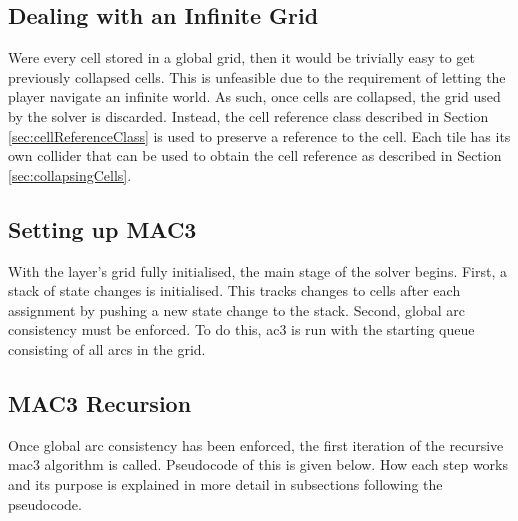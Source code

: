 \subsection{Dealing with an Infinite Grid}
Were every cell stored in a global grid, then it would be trivially easy to get previously collapsed cells. This is unfeasible due to the requirement of letting the player navigate an infinite world. As such, once cells are collapsed, the grid used by the solver is discarded. Instead, the cell reference class described in Section \ref{sec:cellReferenceClass} is used to preserve a reference to the cell. Each tile has its own collider that can be used to obtain the cell reference as described in Section \ref{sec:collapsingCells}.%

\subsection{Setting up MAC3}
With the layer's grid fully initialised, the main stage of the solver begins. First, a stack of state changes is initialised. This tracks changes to cells after each assignment by pushing a new state change to the stack. Second, global arc consistency must be enforced. To do this, \acrshort{ac3} is run with the starting queue consisting of all arcs in the grid.

\subsection{MAC3 Recursion}
Once global arc consistency has been enforced, the first iteration of the recursive \acrshort{mac3} algorithm is called. Pseudocode of this is given below. How each step works and its purpose is explained in more detail in subsections following the pseudocode.

